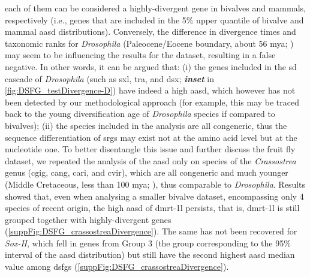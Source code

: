 each of them can be considered a highly-divergent gene in bivalves and mammals, respectively (i.e., genes that are included in the 5\% upper quantile of bivalve and mammal \gls{aasd} distributions). Conversely, the difference in divergence times and taxonomic ranks for \textit{Drosophila} (Paleocene/Eocene boundary, about 56 \gls{mya}; ) may seem to be influencing the results for the dataset, resulting in a false negative. In other words, it can be argued that: (i) the genes included in the \gls{sd} cascade of \textit{Drosophila} (such as \gls{sxl}, \gls{tra}, and \gls{dsx}; \textbf{\textit{inset}} in \cref{fig:DSFG_testDivergence-D}) have indeed a high \gls{aasd}, which however has not been detected by our methodological approach (for example, this may be traced back to the young diversification age of \textit{Drosophila} species if compared to bivalves); (ii) the species included in the analysis are all congeneric, thus the sequence differentiation of \glspl{srg} may exist not at the amino acid level but at the nucleotide one. To better disentangle this issue and further discuss the fruit fly dataset, we repeated the analysis of the \gls{aasd} only on species of the \textit{Crassostrea} genus (\gls{cgig}, \gls{cang}, \gls{cari}, and \gls{cvir}), which are all congeneric and much younger (Middle Cretaceous, less than 100 \gls{mya}; ), thus comparable to \textit{Drosophila}. Results showed that, even when analysing a smaller bivalve dataset, encompassing only 4 species of recent origin, the high \gls{aasd} of \gls{dmrt-1l} persists, that is, \gls{dmrt-1l} is still grouped together with highly-divergent genes (\cref{suppFig:DSFG_crassostreaDivergence}). The same has not been recovered for \textit{Sox-H}, which fell in genes from Group 3 (the group corresponding to the 95\% interval of the \gls{aasd} distribution) but still have the second highest \gls{aasd} median value among \glspl{dsfg} (\cref{suppFig:DSFG_crassostreaDivergence}).

